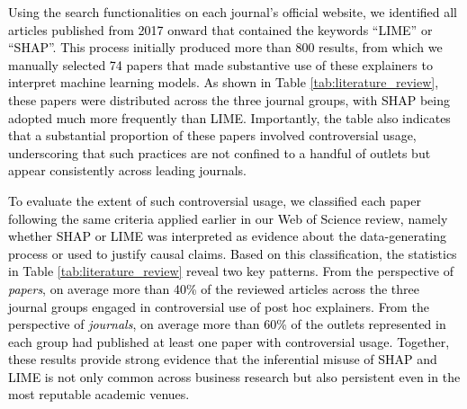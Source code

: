 \documentclass[mnsc,blindrev]{informs3}
\begin{document}
\textcolor{black}{Using the search functionalities on each journal’s official website, we identified all articles published from 2017 onward that contained the keywords “LIME” or “SHAP”. This process initially produced more than 800 results, from which we manually selected 74 papers that made substantive use of these explainers to interpret machine learning models. As shown in Table \ref{tab:literature_review}, these papers were distributed across the three journal groups, with SHAP being adopted much more frequently than LIME. Importantly, the table also indicates that a substantial proportion of these papers involved controversial usage, underscoring that such practices are not confined to a handful of outlets but appear consistently across leading journals.}



\textcolor{black}{To evaluate the extent of such controversial usage, we classified each paper following the same criteria applied earlier in our Web of Science review, namely whether SHAP or LIME was interpreted as evidence about the data-generating process or used to justify causal claims. Based on this classification, the statistics in Table \ref{tab:literature_review} reveal two key patterns. From the perspective of \textit{papers}, on average more than 40\% of the reviewed articles across the three journal groups engaged in controversial use of post hoc explainers. From the perspective of \textit{journals}, on average more than 60\% of the outlets represented in each group had published at least one paper with controversial usage. Together, these results provide strong evidence that the inferential misuse of SHAP and LIME is not only common across business research but also persistent even in the most reputable academic venues. 
}
\end{document}

